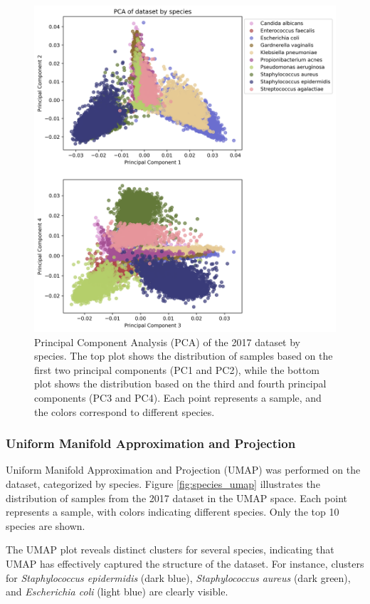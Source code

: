 \documentclass[english,11pt,a4paper,titlepage]{article}
\begin{document}
\begin{figure}[h!]
	\centering
	\includegraphics[width=0.9\linewidth]{img/PCA_combined.png}
	\caption{Principal Component Analysis (PCA) of the 2017 dataset by species. The top plot shows the distribution of samples based on the first two principal components (PC1 and PC2), while the bottom plot shows the distribution based on the third and fourth principal components (PC3 and PC4). Each point represents a sample, and the colors correspond to different species.}
	\label{fig:species_pca}
\end{figure}

\subsubsection*{Uniform Manifold Approximation and Projection}
Uniform Manifold Approximation and Projection (UMAP) was performed on the dataset, categorized by species. Figure \ref{fig:species_umap} illustrates the distribution of samples from the 2017 dataset in the UMAP space. Each point represents a sample, with colors indicating different species. Only the top 10 species are shown.

The UMAP plot reveals distinct clusters for several species, indicating that UMAP has effectively captured the structure of the dataset. For instance, clusters for \textit{Staphylococcus epidermidis} (dark blue), \textit{Staphylococcus aureus} (dark green), and \textit{Escherichia coli} (light blue) are clearly visible.
\end{document}
